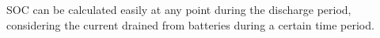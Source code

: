 \documentclass[journal]{IEEEtran}
\begin{document}
SOC can be calculated easily at any point during the discharge period, considering the current drained from batteries during a certain time period. %
%
%
%
%
%
%
%
\end{document}
